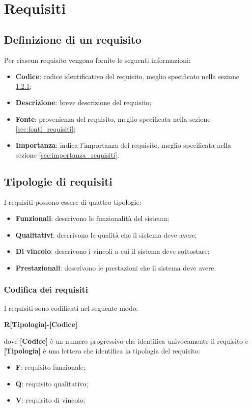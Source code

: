 \section{Requisiti}
\subsection{Definizione di un requisito}
Per ciascun requisito vengono fornite le seguenti informazioni:
\begin{itemize}
	\item \textbf{Codice}: codice identificativo del requisito, meglio specificato nella sezione \ref{sec:codifica_requisiti};
	\item \textbf{Descrizione}: breve descrizione del requisito;
	\item \textbf{Fonte}: provenienza del requisito, meglio specificata nella sezione \ref{sec:fonti_requisiti};
	\item \textbf{Importanza}: indica l'importanza del requisito, meglio specificata nella sezione \ref{sec:importanza_requisiti}.
\end{itemize}

\subsection{Tipologie di requisiti}
I requisiti possono essere di quattro tipologie:
\begin{itemize}
	\item \textbf{Funzionali}: descrivono le funzionalità del sistema;
	\item \textbf{Qualitativi}: descrivono le qualità che il sistema deve avere;
	\item \textbf{Di vincolo}: descrivono i vincoli a cui il sistema deve sottostare;
	\item \textbf{Prestazionali}: descrivono le prestazioni che il sistema deve avere.
\end{itemize}

\subsubsection{Codifica dei requisiti}
\label{sec:codifica_requisiti}
I requisiti sono codificati nel seguente modo:
\begin{center}
	\textbf{R[Tipologia]-[Codice]}
\end{center}
dove \textbf{[Codice]} è un numero progressivo che identifica univocamente il requisito
e \textbf{[Tipologia]} è una lettera che identifica la tipologia del requisito:
\begin{itemize}
	\item \textbf{F}: requisito funzionale;
	\item \textbf{Q}: requisito qualitativo;
	\item \textbf{V}: requisito di vincolo;
\end{itemize}

